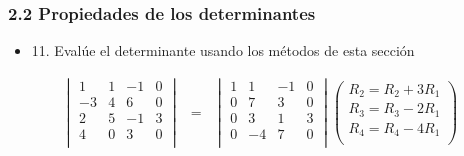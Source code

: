 \documentclass[
]{article}
\begin{document}
\hypertarget{propiedades-de-los-determinantes}{%
\subsubsection{2.2 Propiedades de los
determinantes}\label{propiedades-de-los-determinantes}}

\begin{itemize}
\item
  11. Evalúe el determinante usando los métodos de esta sección
\end{itemize}

\[\begin{matrix}
\begin{vmatrix}
1 & 1 & - 1 & 0 \\
 - 3 & 4 & 6 & 0 \\
2 & 5 & - 1 & 3 \\
4 & 0 & 3 & 0 \\
\end{vmatrix} & = & \begin{vmatrix}
1 & 1 & - 1 & 0 \\
0 & 7 & 3 & 0 \\
0 & 3 & 1 & 3 \\
0 & - 4 & 7 & 0 \\
\end{vmatrix}\begin{pmatrix}
R_{2} = R_{2} + 3R_{1} \\
R_{3} = R_{3} - 2R_{1} \\
R_{4} = R_{4} - 4R_{1} \\
\end{pmatrix} \\
\end{matrix}\]
\end{document}

